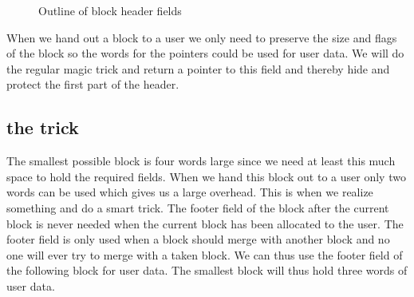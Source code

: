 \documentclass[a4paper,11pt]{article}
\begin{document}
\begin{figure}[t]
\begin{center}
\end{center}
   \caption{Outline of block header fields}
   \label{fig:head} 
 \end{figure}

When we hand out a block to a user we only need to preserve the size
and flags of the block so the words for the pointers could be used for
user data. We will do the regular magic trick and return a pointer to
this field and thereby hide and protect the first part of the
header.

\subsection{the trick}

The smallest possible block is four words large since we need at least
this much space to hold the required fields. When we hand this block
out to a user only two words can be used which gives us a large
overhead. This is when we realize something and do a smart trick. The
footer field of the block after the current block is never needed when
the current block has been allocated to the user. The footer field is
only used when a block should merge with another block and no one will
ever try to merge with a taken block. We can thus use the footer field
of the following block for user data. The smallest block will thus
hold three words of user data.
\end{document}
